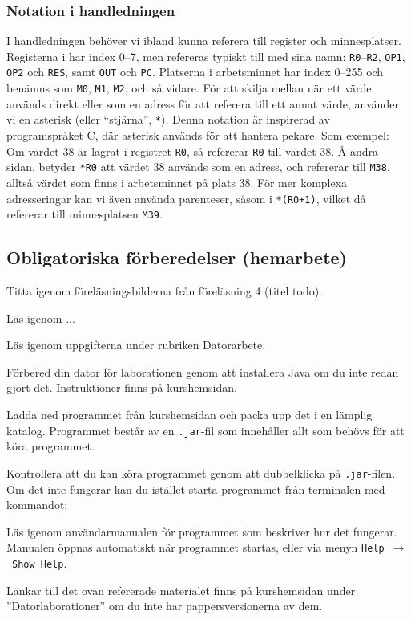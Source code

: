 \subsubsection{Notation i handledningen}
I handledningen behöver vi ibland kunna referera till register och minnesplatser. Registerna i \progname{} har index 0--7, men refereras typiskt till med sina namn: \texttt{R0}--\texttt{R2}, \texttt{OP1}, \texttt{OP2} och \texttt{RES}, samt \texttt{OUT} och \texttt{PC}. Platserna i arbetsminnet har index 0--255 och benämns som \texttt{M0}, \texttt{M1}, \texttt{M2}, och så vidare. För att skilja mellan när ett värde används direkt eller som en adress för att referera till ett annat värde, använder vi en asterisk (eller ``stjärna'', \texttt{*}). Denna notation är inspirerad av programspråket C, där asterisk används för att hantera pekare. Som exempel: Om värdet 38 är lagrat i registret \texttt{R0}, så refererar \texttt{R0} till värdet 38. Å andra sidan, betyder \texttt{*R0} att värdet 38 används som en adress, och refererar till \texttt{M38}, alltså värdet som finns i arbetsminnet på plats 38. För mer komplexa adresseringar kan vi även använda parenteser, såsom i \texttt{*(R0+1)}, vilket då refererar till minnesplatsen \texttt{M39}.



\subsection*{Obligatoriska förberedelser (hemarbete)}
\begin{Hemarbete}\firmlist
    \item Titta igenom föreläsningsbilderna från föreläsning 4 (titel todo).
    \item Läs igenom ...
    \item Läs igenom uppgifterna under rubriken Datorarbete.
    \item Förbered din dator för laborationen genom att installera Java om du inte redan gjort det. Instruktioner finns på kurshemsidan.
    \item Ladda ned programmet \textbf{\progname{}} från kurshemsidan och packa upp det i en lämplig katalog. Programmet består av en \texttt{.jar}-fil som innehåller allt som behövs för att köra programmet.
    \item Kontrollera att du kan köra programmet genom att dubbelklicka på \texttt{.jar}-filen. Om det inte fungerar kan du istället starta programmet från terminalen med kommandot:
    \begin{center}
        {}
    \end{center}
    \item Läs igenom användarmanualen för programmet som beskriver hur det fungerar. Manualen öppnas automatiskt när programmet startas, eller via menyn \texttt{Help}~$\rightarrow$~\texttt{Show Help}.
\end{Hemarbete}
Länkar till det ovan refererade materialet finns på kurshemsidan under  ''Datorlaborationer'' om du inte har pappersversionerna av dem.

